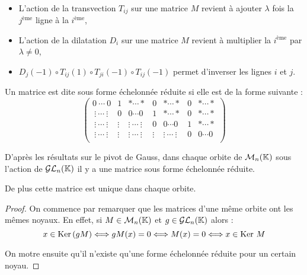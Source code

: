 \begin{example}[Remarque]\ 
\begin{itemize}
 \item L'action de la transvection $T_{ij}$ sur une matrice $M$ revient à
ajouter $\lambda$ fois la $j^{\text{ème}}$ ligne à la $i^{\text{ème}}$,
 \item L'action de la dilatation $D_i$ sur une matrice $M$ revient à multiplier
la $i^{\text{ème}}$ par $\lambda \neq 0$,
 \item $D_j(-1) \circ T_{ij}(1) \circ T_{ji}(-1) \circ T_{ij}(-1)$ permet
d'inverser les lignes $i$ et $j$. 
\end{itemize}
\end{example}


\begin{defi}

Un matrice est dite sous forme échelonnée réduite si elle est de la forme
suivante :
 \begin{displaymath}\begin{pmatrix}
0\ \cdots\              0  &1      &*\cdots *&0&*\cdots *&0&*\cdots *\\
\ \vdots\ \cdots\ \vdots   &0      &0\cdots 0&1&*\cdots *&0&*\cdots *\\
\ \vdots\ \cdots\ \vdots   &\vdots &\vdots\ \cdots\ \vdots&0&0\cdots 0&1&*\cdots
*\\
\ \vdots\ \cdots\ \vdots   &\vdots &\vdots\ \cdots\ \vdots&\vdots&\vdots\
\cdots\  \vdots&0&0\cdots 0\\
   \end{pmatrix} \end{displaymath}
\end{defi}

\begin{lemm}
 
D'après les résultats sur le pivot de Gauss, dans chaque orbite de $\mathcal{M}_n(\mathbb{K})$
sous l'action de $\mathcal{GL}_n(\mathbb{K})$ il y a une matrice sous forme échelonnée réduite.

De plus cette matrice est unique dans chaque orbite.
\end{lemm}

\begin{proof}
 
On commence par remarquer que les matrices d'une même orbite ont les mêmes
noyaux.
En effet, si $M\in \mathcal{M}_n(\mathbb{K})$ et $g\in \mathcal{GL}_n(\mathbb{K})$ alors :
\begin{displaymath} x \in \operatorname{Ker\,}(gM) \Longleftrightarrow gM(x) = 0
\Longleftrightarrow M(x) = 0
\Longleftrightarrow x\in \operatorname{Ker\,} M\end{displaymath}

On motre ensuite qu'il n'existe qu'une forme échelonnée réduite pour un certain
noyau.
\end{proof}

